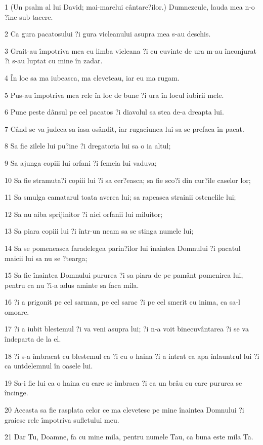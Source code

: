 \par 1 (Un psalm al lui David; mai-marelui cântare?ilor.) Dumnezeule, lauda mea n-o ?ine sub tacere.
\par 2 Ca gura pacatosului ?i gura vicleanului asupra mea s-au deschis.
\par 3 Grait-au împotriva mea cu limba vicleana ?i cu cuvinte de ura m-au înconjurat ?i s-au luptat cu mine în zadar.
\par 4 În loc sa ma iubeasca, ma cleveteau, iar eu ma rugam.
\par 5 Pus-au împotriva mea rele în loc de bune ?i ura în locul iubirii mele.
\par 6 Pune peste dânsul pe cel pacatos ?i diavolul sa stea de-a dreapta lui.
\par 7 Când se va judeca sa iasa osândit, iar rugaciunea lui sa se prefaca în pacat.
\par 8 Sa fie zilele lui pu?ine ?i dregatoria lui sa o ia altul;
\par 9 Sa ajunga copiii lui orfani ?i femeia lui vaduva;
\par 10 Sa fie stramuta?i copiii lui ?i sa cer?easca; sa fie sco?i din cur?ile caselor lor;
\par 11 Sa smulga camatarul toata averea lui; sa rapeasca strainii ostenelile lui;
\par 12 Sa nu aiba sprijinitor ?i nici orfanii lui miluitor;
\par 13 Sa piara copiii lui ?i într-un neam sa se stinga numele lui;
\par 14 Sa se pomeneasca faradelegea parin?ilor lui înaintea Domnului ?i pacatul maicii lui sa nu se ?tearga;
\par 15 Sa fie înaintea Domnului pururea ?i sa piara de pe pamânt pomenirea lui, pentru ca nu ?i-a adus aminte sa faca mila.
\par 16 ?i a prigonit pe cel sarman, pe cel sarac ?i pe cel smerit cu inima, ca sa-l omoare.
\par 17 ?i a iubit blestemul ?i va veni asupra lui; ?i n-a voit binecuvântarea ?i se va îndeparta de la el.
\par 18 ?i s-a îmbracat cu blestemul ca ?i cu o haina ?i a intrat ca apa înlauntrul lui ?i ca untdelemnul în oasele lui.
\par 19 Sa-i fie lui ca o haina cu care se îmbraca ?i ca un brâu cu care pururea se încinge.
\par 20 Aceasta sa fie rasplata celor ce ma clevetesc pe mine înaintea Domnului ?i graiesc rele împotriva sufletului meu.
\par 21 Dar Tu, Doamne, fa cu mine mila, pentru numele Tau, ca buna este mila Ta.
